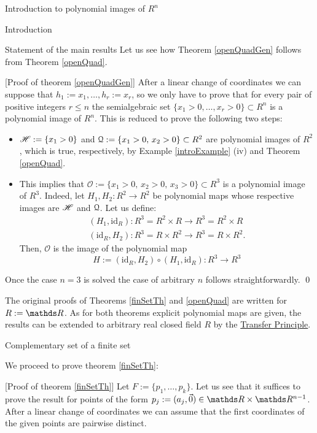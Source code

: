 \documentclass[11pt, a4paper, english, twoside, notitlepage, openright]{report}
\begin{document}
\begin{chapter}{Introduction to polynomial images of $R^n$}
\begin{section}{Introduction}
\begin{subsection}{Statement of the main results}
Let us see how Theorem \ref{openQuadGen} follows from Theorem \ref{openQuad}.
		
\vspace{1mm}		
		
[Proof of theorem \ref{openQuadGen}] After a linear change of coordinates we can suppose that $h_1:=x_1,\dots,h_r:=x_r$,  so we only have to prove that for every pair of positive integers $r\leq n$ the semialgebraic set $\{x_1>0,\dots,x_r>0\}\subset R^n$ is a polynomial image of $R^n$. This is reduced to prove the following two steps:
\begin{itemize}
\item $\mathscr{H}:=\{x_1>0\}$ and $\mathcal{Q}:=\{x_1>0,\, x_2>0\}\subset R^2$ are polynomial images of $R^2$, which is true, respectively, by Example \ref{introExample} (iv) and Theorem \ref{openQuad}.
\item This implies that $\mathscr{O}:=\{x_1>0,\, x_2>0,\, x_3>0\}\subset R^3$ is a polynomial image of $R^3$. Indeed, let $H_1,H_2:R^2 \rightarrow R^2$ be polynomial maps whose respective images are $\mathscr{H}$ and $\mathcal{Q}$. Let us define:
\begin{align*}
(H_1,\text{id}_R): R^3=R^2\times R\longrightarrow R^3= R^2\times R\\
(\text{id}_R,H_2): R^3=R\times R^2\longrightarrow R^3= R\times R^2.
\end{align*}
Then, $\mathscr{O}$ is the image of the polynomial map 
$$
H:=(\text{id}_R,H_2)\circ(H_1,\text{id}_R):R^3\rightarrow R^3
$$ 
\end{itemize} 
Once the case $n=3$ is solved the case of arbitrary $n$ follows straightforwardly.	\qed		

\vspace{1mm}
		
The original proofs of Theorems \ref{finSetTh} and \ref{openQuad} are written for $R:=\R$. As for both theorems explicit polynomial maps are given, the results can be extended to arbitrary real closed field $R$ by the \hyperref[TP]{Transfer Principle}.
\end{subsection}
\end{section}

\begin{section}{Complementary set of a finite set}
	
We proceed to prove theorem \ref{finSetTh}:
	
\vspace{1mm}
	
[Proof of theorem \ref{finSetTh}] Let $F:=\{p_1,\dots,p_k\}$. Let us see that it suffices to prove the result for points of the form $p_j:=(a_j,\vec{0})\in\R\times\R^{n-1}$. After a linear change of coordinates we can assume that the first coordinates of the given points are pairwise distinct. 


\end{section}
\end{chapter}
\end{document}
